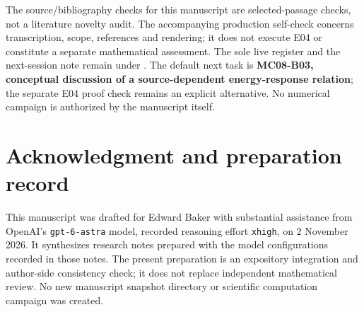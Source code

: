 \documentclass[11pt,letterpaper]{article}
\numberwithin{equation}{section}
\theoremstyle{remark}
\begin{document}
The source/bibliography checks for this manuscript are selected-passage
checks, not a literature novelty audit. The accompanying production
self-check concerns transcription, scope, references and rendering; it
does not execute E04 or constitute a separate mathematical assessment.
The sole live register and the next-session note remain under
. The default next task
is \textbf{MC08-B03, conceptual discussion of a source-dependent
energy-response relation}; the separate E04 proof check remains an
explicit alternative. No numerical campaign is authorized by the
manuscript itself.

\section*{Acknowledgment and preparation record}
This manuscript was drafted for Edward Baker with substantial assistance
from OpenAI's \texttt{gpt-6-astra} model, recorded reasoning effort
\texttt{xhigh}, on 2 November 2026. It synthesizes research notes prepared
with the model configurations recorded in those notes. The present
preparation is an expository integration and author-side consistency
check; it does not replace independent mathematical review. No new
manuscript snapshot directory or scientific computation campaign was
created.



\end{document}
